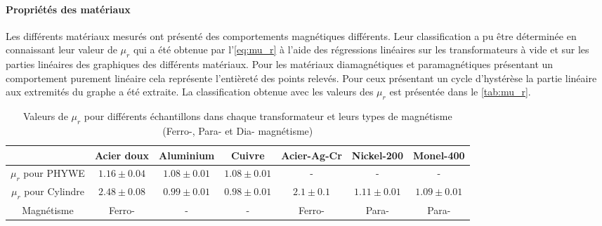 \paragraph{Propriétés des matériaux}
Les différents matériaux mesurés ont présenté des comportements magnétiques différents. Leur classification a pu être déterminée en connaissant leur valeur de \(\mu_r\) qui a été obtenue par l'\autoref{eq:mu_r} à l'aide des régressions linéaires sur les transformateurs à vide et sur les parties linéaires des graphiques des différents matériaux. Pour les matériaux diamagnétiques et paramagnétiques présentant un comportement purement linéaire cela représente l'entièreté des points relevés. Pour ceux présentant un cycle d'hystérèse la partie linéaire aux extremités du graphe a été extraite. La classification obtenue avec les valeurs des \(\mu_r\) est présentée dans le \autoref{tab:mu_r}.

\begin{table}[h]
    \centering
    \begin{tabulary}{\linewidth}{c c c c c c c}
        \toprule
        & Acier doux & Aluminium & Cuivre & Acier-Ag-Cr & Nickel-200 & Monel-400 \\
        \midrule
        \(\mu_r\) pour PHYWE & \(1.16 \pm 0.04\) & \(1.08 \pm 0.01\) & \(1.08 \pm 0.01\) & - & - & - \\
        \(\mu_r\) pour Cylindre & \(2.48 \pm 0.08\) & \(0.99 \pm 0.01\) & \(0.98 \pm 0.01\) & \(2.1 \pm 0.1\) & \(1.11 \pm 0.01\) & \(1.09 \pm 0.01\) \\
        Magnétisme & Ferro- & - & - & Ferro- & Para- & Para- \\
        \bottomrule
    \end{tabulary}
    \caption{Valeurs de \(\mu_r\) pour différents échantillons dans chaque transformateur et leurs types de magnétisme (Ferro-, Para- et Dia- magnétisme)}
    \label{tab:mu_r}
\end{table}


